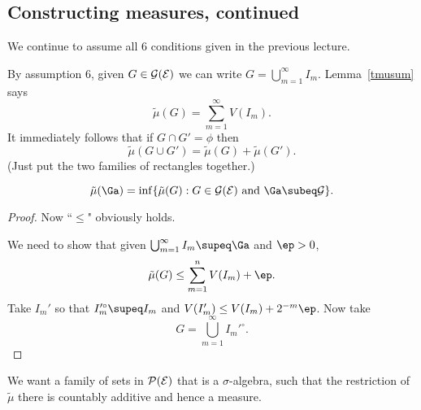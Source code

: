 
\subsection{Constructing measures, continued}

We continue to assume all 6 conditions given in the previous lecture.

By assumption 6, given $G\in \cal G(E)$ we can write $G=\bigcup_{m=1}^{\infty} I_m$. Lemma~\ref{tmusum} says
\[
\tilde{\mu}(G)=\sum_{m=1}^{\infty} V(I_m).
\]
It immediately follows that if $G\cap G'=\phi$ then
\[
\tilde{\mu}(G\cup G')=\tilde{\mu}(G)+\tilde{\mu}(G').
\]
(Just put the two families of rectangles together.)

\begin{pr}\label{tmuinf}
\[
\tilde{\mu}(\Ga)=
\inf\{\tilde{\mu}(G):G\in \cal G(E)\text{ and }\Ga\subeq G\}.
\]
\end{pr}
\begin{proof}
Now ``$\leq$" obviously holds.

We need to show that given $\bigcup_{m=1}^{\infty} I_m\supeq \Ga$ and  $\ep>0$, 
\[
\tilde{\mu}(G)\leq \sum_{m=1}^n V(I_m)+\ep.
\] 
Take $I_m'$ so that $I_m'^{\circ} \supeq I_m$ and $V(I_m')\leq V(I_m)+2^{-m}\ep$. Now take
\[
G=\bigcup_{m=1}^{\infty} I_m'^{\circ}.
\]
\end{proof}

We want a family of sets in $\cal P(E)$ that is a $\sigma$-algebra, such that the restriction of $\tilde{\mu}$ there is countably additive and hence a measure.

